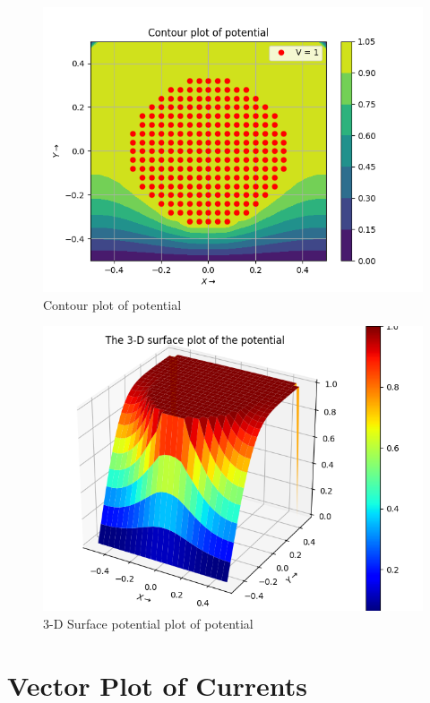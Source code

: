 \documentclass[11pt, a4paper]{article}
\begin{document}
\begin{figure}[tbh]
 \centering
 \includegraphics[scale=0.7]{Figure_7.png}  
 \caption{Contour plot of potential}
\end{figure}

\begin{figure}[!tbh]
 \centering
 \includegraphics[scale=0.7]{Figure_8.png}  
 \caption{3-D Surface potential plot of potential}
\end{figure}
\newpage
\newpage

\section{Vector Plot of Currents}
\end{document}
